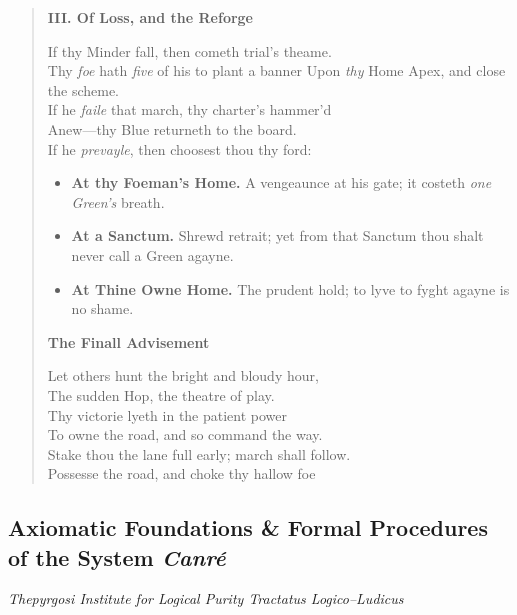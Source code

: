 \documentclass[11pt]{article}
\begin{document}
\begin{quote}
\medskip
\textbf{III. Of Loss, and the Reforge}

If thy Minder fall, then cometh trial’s theame.\\
Thy \emph{foe} hath \emph{five} of his to plant a banner
Upon \emph{thy} Home Apex, and close the scheme.\\
If he \emph{faile} that march, thy charter’s hammer’d\\
Anew—thy Blue returneth to the board.\\
If he \emph{prevayle}, then choosest thou thy ford:\\[-0.25em]
\begin{itemize}\itemsep0.2em
  \item \textbf{At thy Foeman’s Home.} A vengeaunce at his gate; it costeth \emph{one Green’s} breath.
  \item \textbf{At a Sanctum.} Shrewd retrait; yet from that Sanctum thou shalt never call a Green agayne.
  \item \textbf{At Thine Owne Home.} The prudent hold; to lyve to fyght agayne is no shame.
\end{itemize}

\medskip
\textbf{The Finall Advisement}

Let others hunt the bright and bloudy hour,\\
The sudden Hop, the theatre of play.\\
Thy victorie lyeth in the patient power\\
To owne the road, and so command the way.\\
Stake thou the lane full early; march shall follow.\\
Possesse the road, and choke thy hallow foe
\end{quote}

\clearpage

\subsection{Axiomatic Foundations \& Formal Procedures of the System \textit{Canré}}
\noindent\textit{Thepyrgosi Institute for Logical Purity \quad Tractatus Logico--Ludicus}
\end{document}
